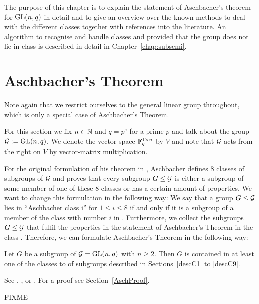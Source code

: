 The purpose of this chapter is to explain the statement of Aschbacher's 
theorem for $\GL(n,q)$ in detail and to give an overview over the known
methods to deal with the different classes together with references into
the literature. An algorithm to recognise and handle classes  and 
provided that the group does not lie in class  is described in detail
in Chapter~\ref{chap:subsemi}.

\section{Aschbacher's Theorem}
\label{sect:aschbacher}

Note again that we restrict ourselves to the general linear group
throughout, which is only a special case of Aschbacher's Theorem.

\begin{Not}
For this section we fix $n \in \mathbb{N}$ and $q=p^e$ for a prime $p$ and
talk about the group $\GG := \GL(n,q)$. We denote the vector space $\mathbb{F}_q^{1
\times n}$ by $V$ and note that $\mathcal{G}$ acts from the right on $V$ by
vector-matrix multiplication.
\end{Not}

For the original formulation of his theorem in \cite{aschbacher}, Aschbacher 
defines $8$ classes
of subgroups of $\mathcal{G}$ and proves that every subgroup $G \le \mathcal{G}$ is either
a subgroup of some member of one of these $8$ classes or has a certain
amount of properties. We want to change this formulation in the following
way: We say that a group $G \le \mathcal{G}$ lies in ``Aschbacher class \CC i''
for $1 \le i \le 8$ if and only if it is a subgroup of a member of
the class with number $i$ in \cite{aschbacher}. Furthermore, we collect
the subgroups $G \le \mathcal{G}$ that fulfil the properties in the statement of 
Aschbacher's Theorem in the class . Therefore, we can formulate
Aschbacher's Theorem in the following way:

\begin{Theo}
\label{Asch}
Let $G$ be a subgroup of\/ $\GG = \GL(n,q)$ with $n \ge 2$.
Then $G$ is contained in at least one of the
classes  to  of subgroups described in Sections~\ref{descC1}
to \ref{descC9}.
\end{Theo}
\proofbeg See \cite[Appendix 2, Theorem 1]{RobPhd}, \cite{aschbacher}, 
\cite{kleilieb} or
\cite[Theorem~1]{smashprim}. For a proof see Section~\ref{AschProof}.
\proofend

\begin{Rem}
FIXME
\end{Rem}

